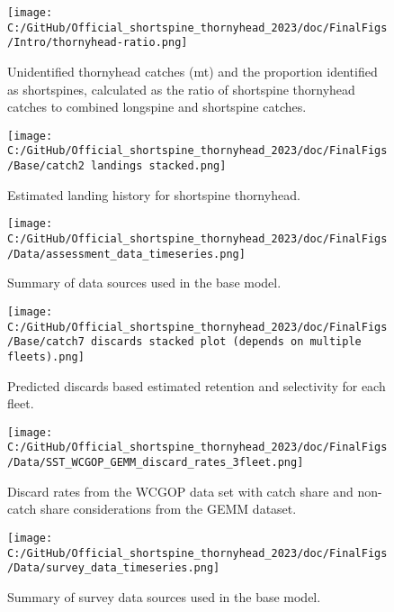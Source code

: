 \documentclass[11pt,
  english,
  letterpaper,
]{article}
\begin{document}
\begin{figure}
\centering
\texttt{[image: C:/GitHub/Official\_shortspine\_thornyhead\_2023/doc/FinalFigs/Intro/thornyhead-ratio.png]}
\caption{Unidentified thornyhead catches (mt) and the proportion identified as shortspines, calculated as the ratio of shortspine thornyhead catches to combined longspine and shortspine catches.\label{fig:thornyhead-ratio}}
\end{figure}

\newpage

\clearpage

\begin{figure}
\centering
\texttt{[image: C:/GitHub/Official\_shortspine\_thornyhead\_2023/doc/FinalFigs/Base/catch2 landings stacked.png]}
\caption{Estimated landing history for shortspine thornyhead.\label{fig:catch_hist}}
\end{figure}

\newpage

\begin{figure}
\centering
\texttt{[image: C:/GitHub/Official\_shortspine\_thornyhead\_2023/doc/FinalFigs/Data/assessment\_data\_timeseries.png]}
\caption{Summary of data sources used in the base model.\label{fig:assessment_data_timeseries}}
\end{figure}

\begin{figure}
\centering
\texttt{[image: C:/GitHub/Official\_shortspine\_thornyhead\_2023/doc/FinalFigs/Base/catch7 discards stacked plot (depends on multiple fleets).png]}
\caption{Predicted discards based estimated retention and selectivity for each fleet.\label{fig:disc_hist}}
\end{figure}

\begin{figure}
\centering
\texttt{[image: C:/GitHub/Official\_shortspine\_thornyhead\_2023/doc/FinalFigs/Data/SST\_WCGOP\_GEMM\_discard\_rates\_3fleet.png]}
\caption{Discard rates from the WCGOP data set with catch share and non-catch share considerations from the GEMM dataset.\label{fig:disc_rates_WCGOP}}
\end{figure}

\newpage

\begin{figure}
\centering
\texttt{[image: C:/GitHub/Official\_shortspine\_thornyhead\_2023/doc/FinalFigs/Data/survey\_data\_timeseries.png]}
\caption{Summary of survey data sources used in the base model.\label{fig:survey_data_timeseries}}
\end{figure}
\end{document}
